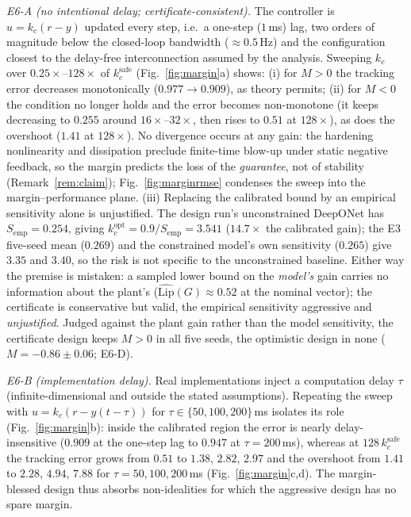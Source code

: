 \documentclass[11pt,sagev,times]{sagej}
\begin{document}
\emph{E6-A (no intentional delay; certificate-consistent).} The controller
is $u=k_c(r-y)$ updated every step, i.e.\ a one-step ($1$\,ms) lag, two orders
of magnitude below the closed-loop bandwidth ($\approx0.5$\,Hz) and the
configuration closest to the delay-free interconnection assumed by the
analysis. Sweeping $k_c$ over $0.25\times$--$128\times$ of
$k_c^{\mathrm{safe}}$ (Fig.~\ref{fig:margin}a) shows: (i) for $M>0$ the
tracking error decreases monotonically ($0.977\to0.909$), as theory permits; (ii) for $M<0$ the condition no
longer holds and the error becomes non-monotone (it keeps decreasing to
$0.255$ around $16\times$--$32\times$, then rises to $0.51$ at $128\times$),
as does the overshoot ($1.41$ at $128\times$). No divergence occurs at any gain:
the hardening nonlinearity and dissipation preclude finite-time blow-up under
static negative feedback, so the margin predicts the loss of the
\emph{guarantee}, not of stability
(Remark~\ref{rem:claim}); Fig.~\ref{fig:marginrmse} condenses the sweep into
the margin--performance plane. (iii) Replacing the calibrated bound by an
empirical sensitivity alone is unjustified. The design run's unconstrained
DeepONet has $S_{\mathrm{emp}}=0.254$, giving
$k_c^{\mathrm{opt}}=0.9/S_{\mathrm{emp}}=3.541$ ($14.7\times$ the calibrated
gain); the E3 five-seed mean ($0.269$) and the constrained model's own
sensitivity ($0.265$) give $3.35$ and $3.40$, so the risk is not specific to
the unconstrained baseline. Either way the premise is mistaken: a sampled lower
bound on the \emph{model's} gain carries no information about the plant's
($\widehat{\mathrm{Lip}}(G)\approx0.52$ at the nominal vector); the
certificate is conservative but valid, the empirical sensitivity aggressive
and \emph{unjustified}. Judged against the plant gain rather than the model
sensitivity, the certificate design keeps $M>0$ in all five seeds, the
optimistic design in none ($M=-0.86\pm0.06$; E6-D).

\emph{E6-B (implementation delay).} Real implementations inject a computation
delay $\tau$ (infinite-dimensional and outside the stated assumptions).
Repeating the sweep with $u=k_c(r-y(t-\tau))$ for $\tau\in\{50,100,200\}$\,ms isolates
its role (Fig.~\ref{fig:margin}b): inside the calibrated region the error is
nearly delay-insensitive ($0.909$ at the one-step lag to $0.947$ at
$\tau=200$\,ms), whereas at $128\,k_c^{\mathrm{safe}}$ the tracking error
grows from $0.51$ to $1.38$, $2.82$, $2.97$ and the overshoot from $1.41$ to
$2.28$, $4.94$, $7.88$ for $\tau=50,100,200$\,ms
(Fig.~\ref{fig:margin}c,d). The margin-blessed design thus absorbs
non-idealities for which the aggressive design has no spare margin.
\end{document}
